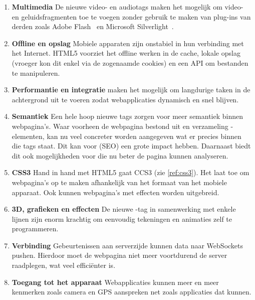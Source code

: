 \begin{enumerate}
\item \textbf{Multimedia} 
De nieuwe video- en audiotags maken het mogelijk om video- en geluidsfragmenten toe te voegen zonder gebruik te maken van plug-ins van derden zoals Adobe Flash~\cite{Adobe2013} en Microsoft Silverlight~\cite{Microsoft2013}.

\item \textbf{Offline en opslag}  
Mobiele apparaten zijn onstabiel in hun verbinding met het Internet. HTML5 voorziet het offline werken in de cache, lokale opslag (vroeger kon dit enkel via de zogenaamde cookies) en een API om bestanden te manipuleren.

\item \textbf{Performantie en integratie}
 maken het mogelijk om langdurige \js{} taken in de achtergrond uit te voeren zodat webapplicaties dynamisch en snel blijven.

\item \textbf{Semantiek}
Een hele hoop nieuwe tags zorgen voor meer semantiek binnen webpagina's. 
Waar voorheen de webpagina bestond uit en verzameling -elementen, kan nu veel concreter worden aangegeven wat er precies binnen die tags staat. 
Dit kan voor  (SEO) een grote impact hebben. 
Daarnaast biedt dit ook mogelijkheden voor  die nu beter de pagina kunnen analyseren.

\item \textbf{CSS3}
Hand in hand met HTML5 gaat CCS3 (zie \ref{ref:css3}). 
Het laat toe om webpagina's op te maken afhankelijk van het formaat van het mobiele apparaat. 
Ook kunnen webpagina's met effecten worden uitgebreid. 

\item \textbf{3D, grafieken en effecten}
De nieuwe -tag in samenwerking met enkele lijnen \js{} zijn enorm krachtig om eenvoudig tekeningen en animaties zelf te programmeren.

\item \textbf{Verbinding}
\term Gebeurtenissen aan serverzijde kunnen data naar WebSockets pushen. Hierdoor moet de webpagina niet meer voortdurend de server raadplegen, wat veel efficiënter is.

\item \textbf{Toegang tot het apparaat}
Webapplicaties kunnen meer en meer kenmerken zoals camera en GPS aanspreken net zoals  applicaties dat kunnen. 
\end{enumerate}

